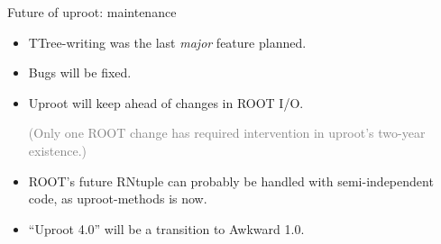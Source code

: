 \documentclass[aspectratio=169]{beamer}
\begin{document}
\begin{frame}{Future of uproot: maintenance}
\Large
\vspace{0.35 cm}
\begin{itemize}\setlength{\itemsep}{0.25 cm}
\item<1-> TTree-writing was the last {\it major} feature planned.
\item<2-> Bugs will be fixed.
\item<3-> Uproot will keep ahead of changes in ROOT I/O.

\vspace{0.05 cm}
\textcolor{gray}{\normalsize (Only one ROOT change has required intervention in uproot's two-year existence.)}

\item<4-> ROOT's future RNtuple can probably be handled with semi-independent code, as uproot-methods is now.
\item<5-> ``Uproot 4.0'' will be a transition to Awkward 1.0.
\end{itemize}

\normalsize
\vspace{0.25 cm}
\end{frame}
\end{document}
